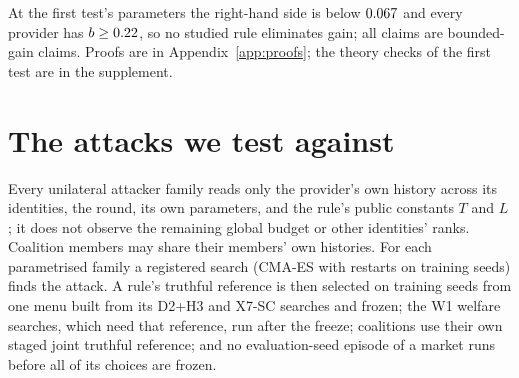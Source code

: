 \documentclass[11pt]{article}
\begin{document}
At the first test's parameters the right-hand side is below $0.067$ and every provider has $b \ge 0.22$, so no studied rule eliminates gain; all claims are bounded-gain claims. Proofs are in Appendix~\ref{app:proofs}; the theory checks of the first test are in the supplement.

\section{The attacks we test against}\label{sec:attacks}
Every unilateral attacker family reads only the provider's own history across its identities, the round, its own parameters, and the rule's public constants $T$ and $L$; it does not observe the remaining global budget or other identities' ranks. Coalition members may share their members' own histories. For each parametrised family a registered search (CMA-ES with restarts on training seeds) finds the attack. A rule's truthful reference is then selected on training seeds from one menu built from its D2+H3 and X7-SC searches and frozen; the W1 welfare searches, which need that reference, run after the freeze; coalitions use their own staged joint truthful reference; and no evaluation-seed episode of a market runs before all of its choices are frozen.
\end{document}
